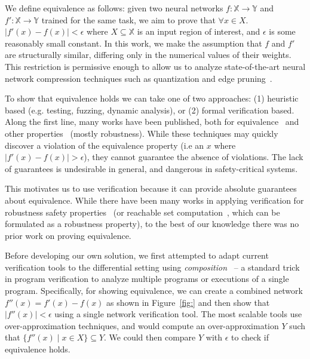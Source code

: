 We define equivalence as follows: given two neural networks $ f : \mathbb{X} \to
\mathbb{Y} $ and $ f' : \mathbb{X} \to \mathbb{Y} $ trained for the same task,
we aim to prove that $ \forall x \in X $. $ |f'(x) - f(x)| < \epsilon $ where $ X
\subseteq \mathbb{X} $ is an input region of interest, and $ \epsilon $ is some
reasonably small constant. In this work, we make the assumption that $ f $ and $
f' $ are structurally similar, differing only in the numerical values of their
weights. This restriction is permissive enough to allow us to analyze
state-of-the-art neural network compression techniques such as quantization and
edge pruning~\cite{HanMD16}.

To show that equivalence holds we can take one of two approaches: (1) heuristic
based (e.g. testing, fuzzing, dynamic analysis), or (2) formal verification
based. Along the first line, many works have been published, both for
equivalence~\cite{xie2019diffchaser,PeiCYJ17,MaLLZG18} and other
properties~\cite{ma2018deepgauge,xie2019deephunter,SunWRHKK18,TianPJR18,
odena2018tensorfuzz} (mostly robustness). While these techniques
may quickly discover a violation of the equivalence property (i.e an $ x $ where
$ |f'(x) - f(x)| > \epsilon $), they cannot guarantee the
absence of violations. The lack of guarantees is undesirable in general, and
dangerous in safety-critical systems.

This motivates us to use verification because it can provide absolute guarantees
about equivalence. While there have been many works in applying verification for
robustness safety properties~\cite{HuangKWW17,Ehlers17,KatzHIJLLSTWZDK19,RuanHK18,
WangPWYJ18nips,SinghGPV19iclr,MirmanGV18,GehrMDTCV18,FischerBDGZV19} (or reachable
set computation~\cite{hu2020reach,everett2021icra}, which can be
formulated as a robustness property), to the best of our knowledge there was no
prior work on proving equivalence.

Before developing our own solution, we first attempted to adapt current
verification tools to the differential setting using
\textit{composition}~\cite{barthe2011secure,terauchi2005secure,barthe2011relational}
 -- a standard trick in program verification to analyze multiple programs or
executions of a single program. Specifically, for showing equivalence, we can
create a combined network $ f''(x) = f'(x) - f(x) $ as shown in Figure~\ref{fig:}
and then show that $ |f''(x)| < \epsilon $ using a single network verification
tool. The most scalable tools use over-approximation techniques, and would
compute an over-approximation $ Y $ such that $ \{f''(x) \; | \; x \in X \}
\subseteq Y $. We could then compare $ Y $ with $ \epsilon $ to check if
equivalence holds.

